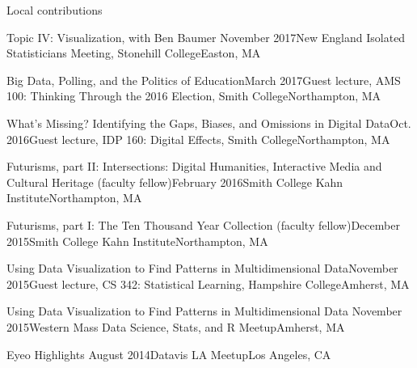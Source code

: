 \documentclass{resume} %
\begin{document}
\begin{rSection}{Local contributions}
\begin{sSubsection}{Topic IV: Visualization}{, with Ben Baumer }{November 2017}{New England Isolated Statisticians Meeting, Stonehill College}{Easton, MA}
\end{sSubsection}

\begin{sSubsection}{Big Data, Polling, and the Politics of Education}{}{March 2017}{Guest lecture, AMS 100: Thinking Through the 2016 Election, Smith College}{Northampton, MA}
\end{sSubsection}

\begin{sSubsection}{What's Missing? Identifying the Gaps, Biases, and Omissions in Digital Data}{}{Oct. 2016}{Guest lecture, IDP 160: Digital Effects, Smith College}{Northampton, MA}
\end{sSubsection}

\begin{sSubsection}{Futurisms, part II: Intersections: Digital Humanities, Interactive Media and Cultural Heritage}{ (faculty fellow)}{February 2016}{Smith College Kahn Institute}{Northampton, MA}
\end{sSubsection}
\begin{sSubsection}{Futurisms, part I: The Ten Thousand Year Collection}{ (faculty fellow)}{December 2015}{Smith College Kahn Institute}{Northampton, MA}
\end{sSubsection}

\begin{sSubsection}{Using Data Visualization to Find Patterns in Multidimensional Data}{}{November 2015}{Guest lecture, CS 342: Statistical Learning, Hampshire College}{Amherst, MA}
\end{sSubsection}

\begin{sSubsection}{Using Data Visualization to Find Patterns in Multidimensional Data}{ }{November 2015}{Western Mass Data Science, Stats, and R Meetup}{Amherst, MA}
\end{sSubsection}

\begin{sSubsection}{Eyeo Highlights}{ }{August 2014}{Datavis LA Meetup}{Los Angeles, CA}
\end{sSubsection}

\end{rSection}
\end{document}
